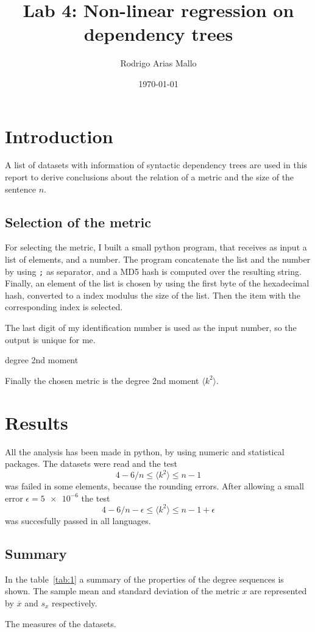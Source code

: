 \documentclass[a4paper]{article}
\title{Lab 4: Non-linear regression on dependency trees}
\author{Rodrigo Arias Mallo}
\date{\today}
\begin{document}
\maketitle

\section{Introduction}

A list of datasets with information of syntactic dependency trees are used in 
this report to derive conclusions about the relation of a metric and the size of 
the sentence $n$.

\subsection{Selection of the metric}
For selecting the metric, I built a small python program, that receives as input 
a list of elements, and a number. The program concatenate the list and the 
number by using \texttt{;} as separator, and a MD5 hash is computed over the 
resulting string. Finally, an element of the list is chosen by using the first 
byte of the hexadecimal hash, converted to a index modulus the size of the list.  
Then the item with the corresponding index is selected.

The last digit of my identification number is used as the input number, so the 
output is unique for me.
%
\begin{textcode}
degree 2nd moment
\end{textcode}
%
Finally the chosen metric is the degree 2nd moment $\langle k^2 \rangle$.

\section{Results}

All the analysis has been made in python, by using numeric and statistical 
packages. The datasets were read and the test
$$4-6/n \le \langle k^2 \rangle \le n-1$$
was failed in some elements, because the rounding errors. After allowing a small 
error $\epsilon = \num{5e-6}$ the test
$$4-6/n - \epsilon \le \langle k^2 \rangle \le n-1 + \epsilon$$
was succesfully passed in all languages.

\subsection{Summary}
In the table~\ref{tab:1} a summary of the properties of the degree sequences is 
shown. The sample mean and standard deviation of the metric $x$ are represented 
by $\overline x$ and $s_x$ respectively.
%
\begin{table}[h]
	\centering
	
	\caption{The measures of the datasets.}
	\label{tab:1}
\end{table}
%
\end{document}
